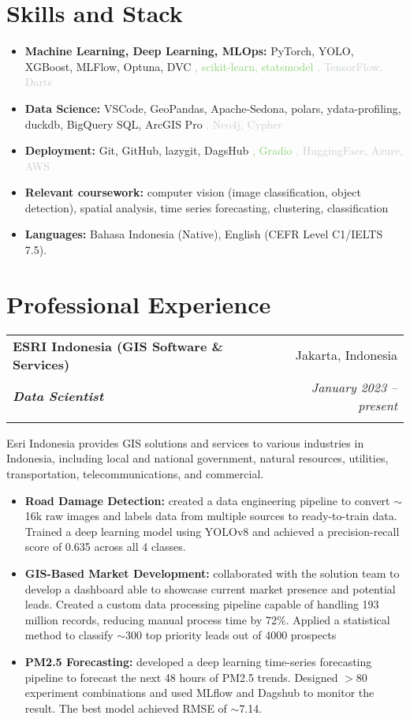 \documentclass[a4paper, 11pt]{article}
\makeatletter
\newcommand{\resumeItem}[2]{
    \item\small{
        \textbf{#1}{#2 \vspace{-2pt}}
    }
}
\newcommand{\resumeSubheading}[4]{
    \vspace{-1pt}
    \begin{tabular*}{\textwidth}{l@{\extracolsep{\fill}}r}
        \color{lightblue}\textbf{#1} & #2 \\
        \textbf{\textit{\small#3}} & \textit{\small #4} \\
        \textnormal{}\vspace{-5pt}
    \end{tabular*}\vspace{-5pt}
}
\newcommand{\resumeItemListStart}{\begin{itemize}[leftmargin=*]\setlength\itemsep{0em}\vspace{-1pt}}
\newcommand{\resumeItemListEnd}{\end{itemize}\vspace{-5pt}}
\makeatother
\begin{document}
    \section{Skills and Stack}
    \resumeItemListStart
    \resumeItem{Machine Learning, Deep Learning, MLOps:}{
        PyTorch, YOLO, XGBoost, MLFlow, Optuna, DVC
        \textcolor[HTML]{8bd274}{, scikit-learn, statsmodel} %
        \textcolor[HTML]{C8cfd4}{, TensorFlow, Darts} %
    }
    \resumeItem{Data Science:}{
        VSCode, GeoPandas, Apache-Sedona, polars, ydata-profiling, duckdb, BigQuery SQL, ArcGIS Pro
        \textcolor[HTML]{C8cfd4}{, Neo4j, Cypher} %
    }
    \resumeItem{Deployment:}{
        Git, GitHub, lazygit, DagsHub
        \textcolor[HTML]{8bd274}{, Gradio} %
        \textcolor[HTML]{C8cfd4}{, HuggingFace, Azure, AWS} %
    }
    \resumeItem{Relevant coursework:}{
        computer vision (image classification, object detection),
        spatial analysis,
        time series forecasting,
        clustering,
        classification
    }
    \resumeItem{Languages:}{
        Bahasa Indonesia (Native), 
        English (CEFR Level C1/IELTS 7.5).
    }
    \resumeItemListEnd
	
    \vspace{-5pt}
    \section{Professional Experience}
    \resumeSubheading
    {ESRI Indonesia (GIS Software \& Services)}{Jakarta, Indonesia}
    {Data Scientist}{January 2023 – present}
    \small{Esri Indonesia provides GIS solutions and services to various industries in 
    Indonesia, including local and national government, natural resources, utilities, 
    transportation, telecommunications, and commercial.}
    \vspace{-1pt}
    \resumeItemListStart
    \resumeItem{Road Damage Detection:}{ created a data engineering pipeline to convert $\sim$16k raw images and labels data from multiple sources to ready-to-train data. Trained a deep learning model using YOLOv8 and achieved a precision-recall score of 0.635 across all 4 classes.}
    \resumeItem{GIS-Based Market Development:}{ collaborated with the solution team to 
    develop a dashboard able to showcase current market presence and potential leads. 
    Created a custom data processing pipeline capable of handling 193 million records, 
    reducing manual process time by 72\%. Applied a statistical method to classify 
    $\sim$300 top priority leads out of 4000 prospects
    }
    \resumeItem{PM2.5 Forecasting:}{ developed a deep learning time-series forecasting pipeline to forecast the next 48 hours of PM2.5 trends. Designed $>$80 experiment combinations and used MLflow and Dagshub to monitor the result. The best model achieved RMSE of $\sim$7.14.
    }
    \resumeItemListEnd
\end{document}
